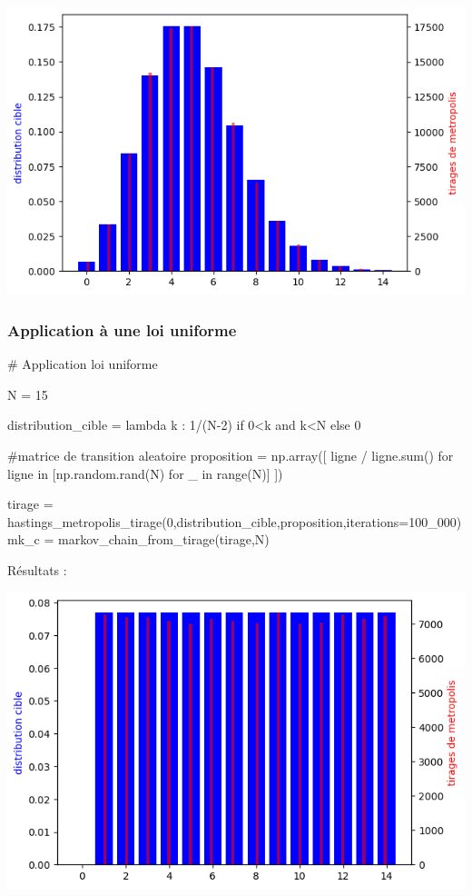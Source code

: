 \documentclass{article}
\begin{document}
\includegraphics[scale=0.5]{poisson.png}

\newpage
\subsubsection{Application à une loi uniforme}

\begin{center}
\begin{python}
# Application loi uniforme

N = 15

distribution_cible = lambda k : 1/(N-2) if 0<k and k<N else 0

#matrice de transition aleatoire
proposition = np.array([ ligne / ligne.sum()
    for ligne in [np.random.rand(N) for _ in range(N)]
])


tirage = hastings_metropolis_tirage(0,distribution_cible,proposition,iterations=100_000)
mk_c = markov_chain_from_tirage(tirage,N)
\end{python}
\end{center}
Résultats :

\includegraphics[scale=0.5]{uniforme.png}
\end{document}
